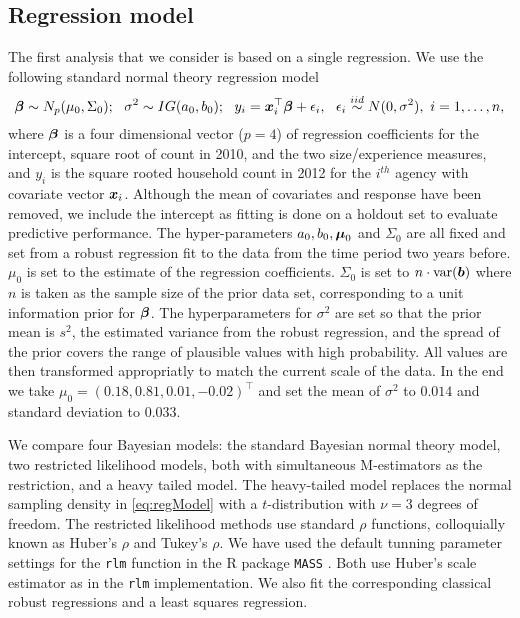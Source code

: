 \documentclass[12pt]{article}
\def\bbeta{\mbox{\boldmath $\beta$}}
\def\bmu{\mbox{\boldmath $\mu$}}
\newcommand{\bx}{\mbox{\boldmath $x$}}
\newcommand{\bb}{\mbox{\boldmath $b$}}
\newcommand{\iid}{\stackrel{iid}{\sim}}
\begin{document}
\subsection{Regression model}
The first analysis that we consider is based on a single regression.  We use 
the following standard normal theory regression model 
\begin{equation}
\label{eq:regModel}
\bbeta\sim N_p(\mu_0, \Sigma_0);\ \ \sigma^2\sim IG(a_0,b_0);\ \  
y_{i}=\bx_{i}^\top\bbeta+\epsilon_{i},\ \ \epsilon_{i}\iid N(0, \sigma^2),\ i=1,\dots, n, 
\end{equation}
where $\bbeta$ is a four dimensional vector ($p=4$) of regression coefficients for the intercept, square root of count in 2010, and the two size/experience measures, and $y_{i}$ is the square rooted household count in 2012 for the $i^{th}$ agency with covariate vector $\bx_{i}$.  Although the mean of covariates and response have been removed, we include the intercept as fitting is done on a holdout set to evaluate predictive performance.  
The hyper-parameters $a_0, b_0, \bmu_0$ and $\Sigma_0$ are all fixed and set from a 
robust regression fit to the data from the time period two years
before. $\mu_0$ is set to the estimate of the regression
coefficients. $\Sigma_0$ is set to $n\cdot \mbox{var}(\bb)$
where $n$ is taken as the sample size of the prior data set, corresponding to  a unit information prior for $\bbeta$. The hyperparameters for $\sigma^2$ are set so that the prior mean is $s^2$, the estimated variance from the robust regression, and the spread of the prior covers the range of plausible values with high probability. All values are then transformed appropriatly to match the current scale of the data. In the end we take $\mu_0=(0.18,  0.81,0.01,-0.02)^\top$ and set the mean of $\sigma^2$ to $0.014$ and standard deviation to  $0.033$. 

We compare four Bayesian models: the standard Bayesian normal theory model, two restricted likelihood models, both with simultaneous M-estimators as the restriction, and a heavy tailed model. The heavy-tailed model replaces the normal sampling density in \eqref{eq:regModel} with a $t$-distribution with $\nu = 3$ degrees of freedom. The restricted likelihood methods use 
standard $\rho$ functions, colloquially known as Huber's $\rho$ and Tukey's $\rho$.  We have used the default tunning parameter settings for the {\tt rlm} function in the R package {\tt MASS} \citep{venables2002}.  Both use Huber's scale estimator as in the {\tt rlm} implementation.  We also fit the corresponding classical robust regressions and a least squares regression.  
\end{document}
